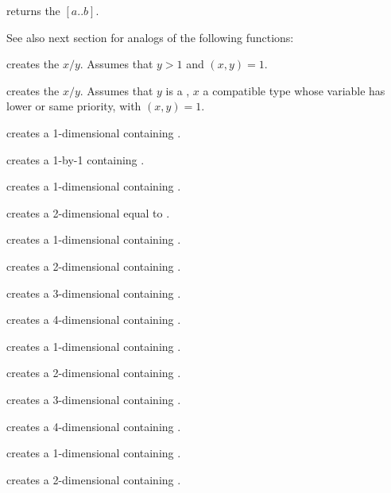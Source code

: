  returns the  $[a..b]$.

\smallskip
See also next section for analogs of the following functions:

 creates the  $x/y$. Assumes that
$y > 1$ and $(x,y) = 1$.

 creates the  $x/y$.
Assumes that $y$ is a , $x$ a compatible type whose variable has
lower or same priority, with $(x,y) = 1$.

 creates a 1-dimensional  containing
.

 creates a 1-by-1  containing .

 creates a 1-dimensional  containing
.

 creates a 2-dimensional  equal
to \kbd{[x,y]}.

 creates a 1-dimensional 
containing .

 creates a 2-dimensional 
containing .

 creates a 3-dimensional 
containing .

 creates a 4-dimensional
 containing .

 creates a 1-dimensional 
containing .

 creates a 2-dimensional 
containing .

 creates a 3-dimensional 
containing .

 creates a 4-dimensional
 containing .

 creates a 1-dimensional 
containing .

 creates a 2-dimensional 
containing \kbd{[x, y]}.


